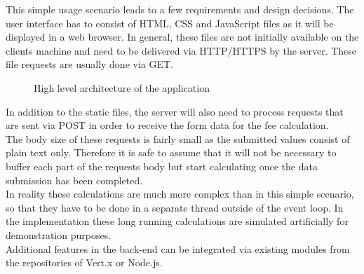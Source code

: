 
This simple usage scenario leads to a few requirements and
design decisions.
The user interface has to consist of HTML, CSS and JavaScript files as it 
will be displayed in a web browser. In general, these files are not initially
available on the clients machine and need to be delivered via HTTP/HTTPS by the
server. These file requests are usually done via GET.\\

\begin{figure}[h]
	\centering
	\setlength\fboxsep{2pt}
	\caption{High level architecture of the application}
	\label{fig:high_level_architecture}
\end{figure}

In addition to the static files, the server will also need to process
requests that are sent via POST in order to receive the form data for the
fee calculation.\\
The body size of these requests is fairly small as the submitted values consist
of plain text only. Therefore it is safe to assume that it will not be necessary to
buffer each part of the requests body but start calculating once the data
submission has been completed.\\
In reality these calculations are much more complex than in this simple scenario,
so that they have to be done in a separate thread outside of the event loop.
In the implementation these long running calculations are simulated artificially for
demonstration purposes.\\
Additional features in the back-end can be integrated via existing modules from
the repositories of Vert.x or Node.js.

